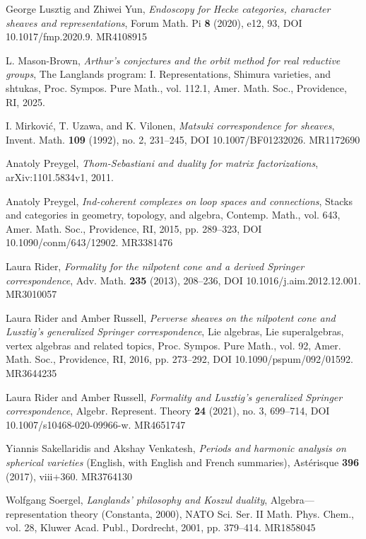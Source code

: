 \begin{refs}
\item[{[LuY20]}] George Lusztig and Zhiwei Yun, \emph{Endoscopy for Hecke categories, character sheaves and representations}, Forum Math. Pi \textbf{8} (2020), e12, 93, DOI 10.1017/fmp.2020.9. MR4108915
\item[{[MB25]}] L. Mason-Brown, \emph{Arthur's conjectures and the orbit method for real reductive groups}, The Langlands program: I. Representations, Shimura varieties, and shtukas, Proc. Sympos. Pure Math., vol. 112.1, Amer. Math. Soc., Providence, RI, 2025.
\item[{[MUV92]}] I. Mirkovi\'c, T. Uzawa, and K. Vilonen, \emph{Matsuki correspondence for sheaves}, Invent. Math. \textbf{109} (1992), no. 2, 231--245, DOI 10.1007/BF01232026. MR1172690
\item[{[Pr11]}] Anatoly Preygel, \emph{Thom-Sebastiani and duality for matrix factorizations}, arXiv:1101.5834v1, 2011.
\item[{[Pr15]}] Anatoly Preygel, \emph{Ind-coherent complexes on loop spaces and connections}, Stacks and categories in geometry, topology, and algebra, Contemp. Math., vol. 643, Amer. Math. Soc., Providence, RI, 2015, pp. 289--323, DOI 10.1090/conm/643/12902. MR3381476
\item[{[Ri13]}] Laura Rider, \emph{Formality for the nilpotent cone and a derived Springer correspondence}, Adv. Math. \textbf{235} (2013), 208--236, DOI 10.1016/j.aim.2012.12.001. MR3010057
\item[{[RiRu16]}] Laura Rider and Amber Russell, \emph{Perverse sheaves on the nilpotent cone and Lusztig's generalized Springer correspondence}, Lie algebras, Lie superalgebras, vertex algebras and related topics, Proc. Sympos. Pure Math., vol. 92, Amer. Math. Soc., Providence, RI, 2016, pp. 273--292, DOI 10.1090/pspum/092/01592. MR3644235
\item[{[RiRu21]}] Laura Rider and Amber Russell, \emph{Formality and Lusztig's generalized Springer correspondence}, Algebr. Represent. Theory \textbf{24} (2021), no. 3, 699--714, DOI 10.1007/s10468-020-09966-w. MR4651747
\item[{[SV17]}] Yiannis Sakellaridis and Akshay Venkatesh, \emph{Periods and harmonic analysis on spherical varieties} (English, with English and French summaries), Ast\'erisque \textbf{396} (2017), viii+360. MR3764130
\item[{[So01]}] Wolfgang Soergel, \emph{Langlands' philosophy and Koszul duality}, Algebra---representation theory (Constanta, 2000), NATO Sci. Ser. II Math. Phys. Chem., vol. 28, Kluwer Acad. Publ., Dordrecht, 2001, pp. 379--414. MR1858045

\end{refs}
